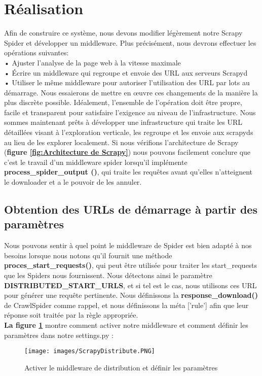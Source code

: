 \section{Réalisation}
Afin de construire ce système, nous devons modifier légèrement notre Scrapy Spider et développer un middleware. Plus précisément, nous devrons effectuer les opérations suivantes: \\
\indent• Ajuster l’analyse de la page web à la vitesse maximale\\
\indent• Écrire un middleware qui regroupe et envoie des URL aux serveurs Scrapyd\\
\indent• Utiliser le même middleware pour autoriser l’utilisation des URL par lots au démarrage.
Nous essaierons de mettre en œuvre ces changements de la manière la plus discrète possible. Idéalement, l'ensemble de l'opération doit être propre, facile et transparent pour satisfaire l'exigence au niveau de l'infrastructure.
Nous sommes maintenant prêts à développer une infrastructure qui traite les URL détaillées visant à l'exploration verticale, les regroupe et les envoie aux scrapyds au lieu de les explorer localement.
Si nous vérifions l'architecture de Scrapy (\textbf{figure \ref{fig:Architecture de Scrapy}}) nous pouvons facilement conclure que c'est le travail d'un middleware spider lorsqu'il implémente \textbf{process\_spider\_output ()}, qui traite les requêtes avant qu'elles n'atteignent le downloader et a le pouvoir de les annuler. 
\subsection{Obtention des URLs de démarrage à partir des paramètres}
Nous pouvons sentir à quel point le middleware de Spider est bien adapté à nos besoins lorsque nous notons qu'il fournit une méthode \textbf{proces\_start\_requests()}, qui peut être utilisée
pour traiter les start\_requests que les Spiders nous fournissent. Nous détectons ainsi le paramètre \textbf{DISTRIBUTED\_START\_URLS}, et si tel est le cas, nous utilisons
ces URL pour générer une requête pertinente. Nous définissons la \textbf{response\_download()} de CrawlSpider comme rappel, et nous définissons la méta ['rule'] afin que leur réponse soit traitée par la règle appropriée.\\

\textbf{La figure \ref{fig:parametre}} montre comment  activer notre middleware et comment définir les paramètres dans notre settings.py :
\begin{figure}[H]
            \centering
            \texttt{[image: images/ScrapyDistribute.PNG]}
            \caption{Activer le middleware de distribution et définir les paramètres}
            \label{fig:parametre}  
        \end{figure}

